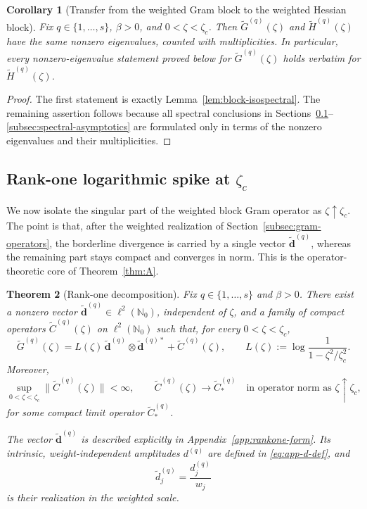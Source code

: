 \documentclass[11pt]{amsart}
\numberwithin{equation}{section}
\theoremstyle{plain}
\newtheorem{theorem}{Theorem}[section]
\newtheorem{corollary}[theorem]{Corollary}
\theoremstyle{definition}
\theoremstyle{remark}
\newcommand{\NN}{\mathbb{N}}
\begin{document}
\begin{corollary}[Transfer from the weighted Gram block to the weighted Hessian block]
	\label{cor:block-transfer}
	Fix \(q\in\{1,\dots,s\}\), \(\beta>0\), and \(0<\zeta<\zeta_c\). Then
	\(\widetilde G^{(q)}(\zeta)\) and \(\widetilde H^{(q)}(\zeta)\) have the
	same nonzero eigenvalues, counted with multiplicities. In particular, every
	nonzero-eigenvalue statement proved below for \(\widetilde G^{(q)}(\zeta)\)
	holds verbatim for \(\widetilde H^{(q)}(\zeta)\).
\end{corollary}

\begin{proof}
	The first statement is exactly Lemma~\ref{lem:block-isospectral}. The
	remaining assertion follows because all spectral conclusions in
	Sections~\ref{subsec:rankone-spike}--\ref{subsec:spectral-asymptotics} are
	formulated only in terms of the nonzero eigenvalues and their
	multiplicities.
\end{proof}

\subsection{Rank-one logarithmic spike at \texorpdfstring{$\zeta_c$}{zeta_c}}
\label{subsec:rankone-spike}

We now isolate the singular part of the weighted block Gram operator as
\(\zeta\uparrow\zeta_c\). The point is that, after the weighted realization of
Section~\ref{subsec:gram-operators}, the borderline divergence is carried by a
single vector \(\widetilde{\bm d}^{(q)}\), whereas the remaining part stays
compact and converges in norm. This is the operator-theoretic core of
Theorem~\ref{thm:A}.

\begin{theorem}[Rank-one decomposition]
	\label{thm:rankone-decomp}
	Fix \(q\in\{1,\dots,s\}\) and \(\beta>0\). There exist a nonzero vector
	\(\widetilde{\bm d}^{(q)}\in\ell^2(\NN_0)\), independent of \(\zeta\), and a
	family of compact operators \(\widetilde C^{(q)}(\zeta)\) on \(\ell^2(\NN_0)\)
	such that, for every \(0<\zeta<\zeta_c\),
	\begin{equation}\label{eq:rankone-decomp}
		\widetilde G^{(q)}(\zeta)
		=
		L(\zeta)\,\widetilde{\bm d}^{(q)}\otimes \widetilde{\bm d}^{(q)*}
		+
		\widetilde C^{(q)}(\zeta),
		\qquad
		L(\zeta):=\log\frac{1}{1-\zeta^2/\zeta_c^2}.
	\end{equation}
	Moreover,
	\[
		\sup_{0<\zeta<\zeta_c}\|\widetilde C^{(q)}(\zeta)\|<\infty,
		\qquad
		\widetilde C^{(q)}(\zeta)\to \widetilde C_*^{(q)}
		\quad\text{in operator norm as }\zeta\uparrow\zeta_c,
	\]
	for some compact limit operator \(\widetilde C_*^{(q)}\).

	The vector \(\widetilde{\bm d}^{(q)}\) is described explicitly in
	Appendix~\ref{app:rankone-form}. Its intrinsic, weight-independent amplitudes
	\(d^{(q)}\) are defined in \eqref{eq:app-d-def}, and
	\[
		\widetilde d^{(q)}_j=\frac{d^{(q)}_j}{w_j}
	\]
	is their realization in the weighted scale.
\end{theorem}
\end{document}
